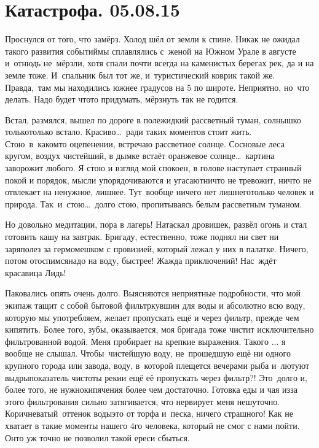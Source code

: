 \chapter{Катастрофа. 05.08.15}

Проснулся от того, что замёрз. Холод шёл от земли к спине. Никак не ожидал такого развития событий\mdash мы сплавлялись с~женой на Южном Урале в августе и~отнюдь не~мёрзли, хотя спали почти всегда на каменистых берегах рек, да и на земле тоже. И~спальник был тот же, и~туристический коврик такой же. Правда,~там мы находились южнее градусов на 5 по широте. Неприятно, но~что делать. Надо будет что\sdash то придумать, мёрзнуть так не годится. 

Встал, размялся, вышел по дороге в поле\mdash жидкий рассветный туман, солнышко только\sdash только встало. Красиво\ldots~ради таких моментов стоит жить. Стою~в~каком\sdash то оцепенении, встречаю рассветное солнце. Сосновые леса кругом, воздух чистейший, в дымке встаёт оранжевое солнце\ldots~картина заворожит любого. Я стою и взгляд мой спокоен, в голове наступает странный покой и порядок, мысли упорядочиваются и угасают\mdash ничто не тревожит, ничто не отвлекает на ненужное, лишнее. Тут~вообще ничего нет лишнего\mdash только человек и природа. Так~и~стою\ldots~долго стою, пропитываясь белым рассветным туманом.

Но довольно медитации, пора в лагерь! Натаскал дровишек, развёл огонь и стал готовить кашу на завтрак. Бригаду, естественно, тоже поднял ни свет ни заря\mdash полез за гермомешком с провизией, который лежал у них в палатке. Ничего, потом отоспимся\mdash надо на воду, быстрее! Жажда приключений! Нас~ждёт красавица Лидь! 

Паковались опять очень долго. Выясняются неприятные подробности, что мой экипаж тащит с собой бытовой фильтр\sdash кувшин для воды и абсолютно всю воду, которую мы употребляем, желает пропускать ещё и через фильтр, прежде чем кипятить. Более того, зубы, оказывается, моя бригада тоже чистит исключительно фильтрованной водой. Меня пробирает на крепкие выражения. Такого ... я вообще не слышал. Чтобы~чистейшую воду, не~прошедшую ещё ни одного крупного города или завода, воду, в~которой плещется вечерами рыба и~лютуют выдры\mdash показатель чистоты реки\mdash и ещё её пропускать через фильтр?! Это~долго и, более того, не нужно\mdash кипячения более чем достаточно. Готовка еды и чая из\sdash за этого фильтрования сильно затягивается, что нервирует меня нешуточно. Коричневатый~оттенок воды\mdash это от торфа и~песка, ничего страшного! Как не хватает в такие моменты нашего 4\sdash го человека, который не смог с нами пойти. Он\sdash то уж точно не позволил такой ереси сбыться. 

